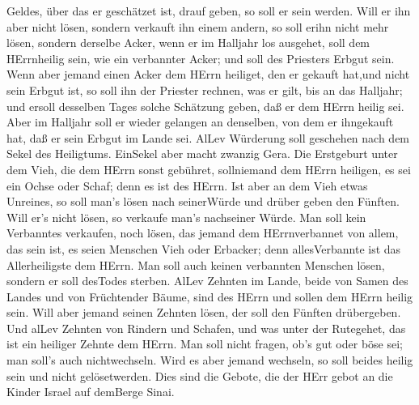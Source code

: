 Geldes, über das er geschätzet ist, drauf geben, so soll er sein werden.
 Will er ihn aber nicht lösen, sondern verkauft ihn einem
andern, so soll erihn nicht mehr lösen,  sondern derselbe
Acker, wenn er im Halljahr los ausgehet, soll dem HErrnheilig sein, wie
ein verbannter Acker; und soll des Priesters Erbgut sein. 
Wenn aber jemand einen Acker dem HErrn heiliget, den er gekauft hat,und
nicht sein Erbgut ist,  so soll ihn der Priester rechnen,
was er gilt, bis an das Halljahr; und ersoll desselben Tages solche
Schätzung geben, daß er dem HErrn heilig sei.  Aber im
Halljahr soll er wieder gelangen an denselben, von dem er ihngekauft
hat, daß er sein Erbgut im Lande sei.  AlLev Würderung soll
geschehen nach dem Sekel des Heiligtums. EinSekel aber macht zwanzig
Gera.  Die Erstgeburt unter dem Vieh, die dem HErrn sonst
gebühret, sollniemand dem HErrn heiligen, es sei ein Ochse oder Schaf;
denn es ist des HErrn.  Ist aber an dem Vieh etwas
Unreines, so soll man's lösen nach seinerWürde und drüber geben den
Fünften. Will er's nicht lösen, so verkaufe man's nachseiner Würde.
 Man soll kein Verbanntes verkaufen, noch lösen, das jemand
dem HErrnverbannet von allem, das sein ist, es seien Menschen Vieh oder
Erbacker; denn allesVerbannte ist das Allerheiligste dem HErrn.
 Man soll auch keinen verbannten Menschen lösen, sondern er
soll desTodes sterben.  AlLev Zehnten im Lande, beide von
Samen des Landes und von Früchtender Bäume, sind des HErrn und sollen
dem HErrn heilig sein.  Will aber jemand seinen Zehnten
lösen, der soll den Fünften drübergeben.  Und alLev Zehnten
von Rindern und Schafen, und was unter der Rutegehet, das ist ein
heiliger Zehnte dem HErrn.  Man soll nicht fragen, ob's gut
oder böse sei; man soll's auch nichtwechseln. Wird es aber jemand
wechseln, so soll beides heilig sein und nicht gelösetwerden.
 Dies sind die Gebote, die der HErr gebot an die Kinder
Israel auf demBerge Sinai.
